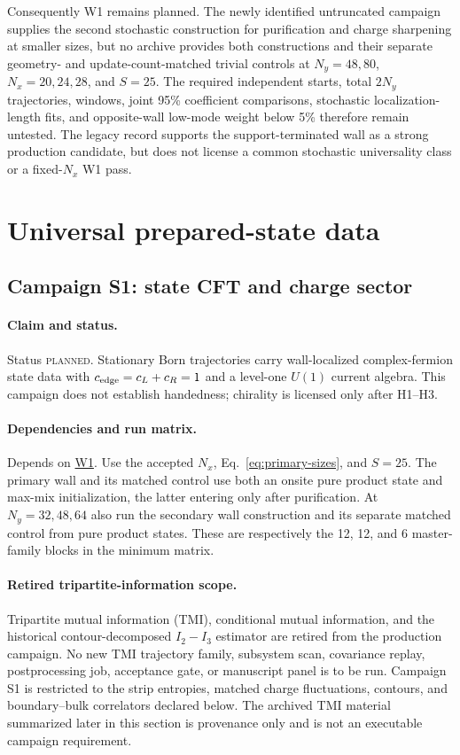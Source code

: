 \documentclass[aps,prx,twocolumn,floatfix,nofootinbib,superscriptaddress,longbibliography]{revtex4-2}
\newcommand{\planned}{\textsc{planned}}
\newcommand{\campref}[1]{\hyperref[camp:#1]{#1}}
\begin{document}
Consequently W1 remains planned.  The newly identified untruncated campaign supplies the
second stochastic construction for purification and charge sharpening at smaller sizes,
but no archive provides both constructions and their separate geometry- and
update-count-matched trivial controls at $N_y=48,80$,
$N_x=20,24,28$, and $S=25$.  The required independent starts, total $2N_y$ trajectories,
windows, joint 95\% coefficient comparisons, stochastic localization-length fits, and
opposite-wall low-mode weight below 5\% therefore remain untested.  The legacy record
supports the support-terminated wall as a strong production candidate, but does not
license a common stochastic universality class or a fixed-$N_x$ W1 pass.

\section{Universal prepared-state data}

\subsection{Campaign S1: state CFT and charge sector}
\label{camp:S1}
\paragraph*{Claim and status.}
Status \planned.  Stationary Born trajectories carry wall-localized complex-fermion state
data with $c_{\rm edge}=c_L+c_R=1$ and a level-one $U(1)$ current algebra.  This campaign
does not establish handedness; chirality is licensed only after H1--H3.

\paragraph*{Dependencies and run matrix.}
Depends on \campref{W1}.  Use the accepted $N_x$, Eq.~\eqref{eq:primary-sizes}, and $S=25$.  The
primary wall and its matched control use both an onsite pure product state and max-mix
initialization, the latter entering only after purification.  At $N_y=32,48,64$ also run
the secondary wall construction and its separate matched control from pure product states.
These are respectively the 12, 12, and 6 master-family blocks in the minimum matrix.

\paragraph*{Retired tripartite-information scope.}
Tripartite mutual information (TMI), conditional mutual information, and the historical
contour-decomposed $I_2-I_3$ estimator are retired from the production campaign.  No new
TMI trajectory family, subsystem scan, covariance replay, postprocessing job, acceptance
gate, or manuscript panel is to be run.  Campaign S1 is restricted to the strip entropies,
matched charge fluctuations, contours, and boundary--bulk correlators declared below.
The archived TMI material summarized later in this section is provenance only and is not
an executable campaign requirement.
\end{document}

